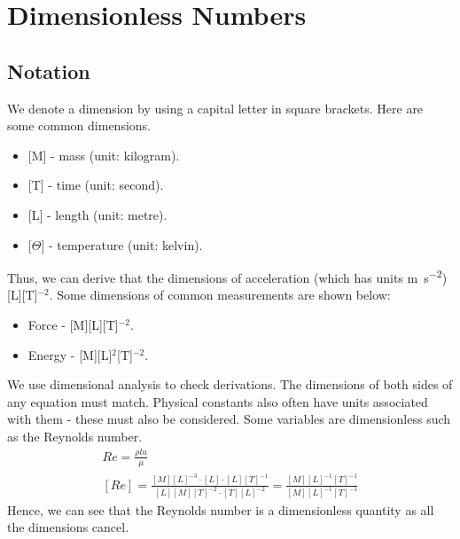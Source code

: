 \documentclass[class=report, crop=false, 12pt,a4paper]{standalone}
\begin{document}
\section{Dimensionless Numbers}
\subsection{Notation}
We denote a dimension by using a capital letter in square brackets. Here are some common dimensions.
\begin{itemize}[noitemsep]
  \item {[M]} - mass (unit: kilogram).
  \item {[T]} - time (unit: second).
  \item {[L]} - length (unit: metre).
  \item {[\(\Theta\)]} - temperature (unit: kelvin).
\end{itemize}
Thus, we can derive that the dimensions of acceleration (which has units \si{\meter\per\second\squared}) [L][T]\(^{-2}\). Some dimensions of common measurements are shown below:
\begin{itemize}[noitemsep]
  \item Force - [M][L][T]\(^{-2}\).
  \item Energy - [M][L]\(^2\)[T]\(^{-2}\).
\end{itemize}
We use dimensional analysis to check derivations. The dimensions of both sides of any equation must match. Physical constants also often have units associated with them - these must also be considered. Some variables are dimensionless such as the Reynolds number.
\begin{gather} 
  Re = \frac{\rho l u}{\mu}\\
  [Re] = \frac{[M][L]^{-3}\cdot [L] \cdot [L][T]^{-1}}{[L][M][T]^{-2}\cdot [T][L]^{-2}} = \frac{[M][L]^{-1}[T]^{-1}}{[M][L]^{-1}[T]^{-1}} 
\end{gather}
Hence, we can see that the Reynolds number is a dimensionless quantity as all the dimensions cancel.
\end{document}
